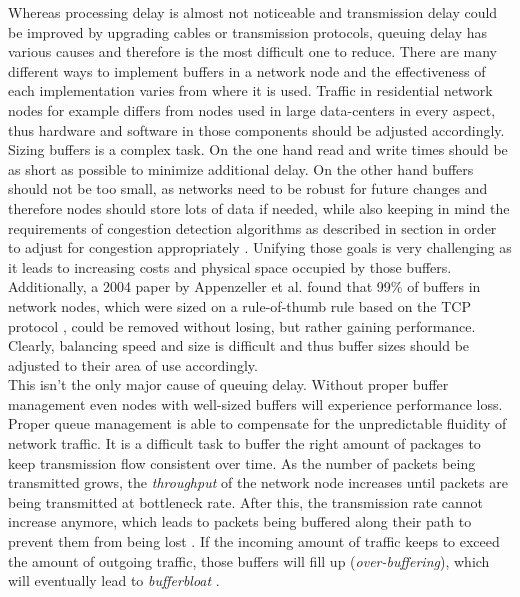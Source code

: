 \documentclass[a4paper,conference]{IEEEtran}
\begin{document}
Whereas processing delay is almost not noticeable and transmission delay could be improved by upgrading cables or transmission protocols, queuing delay has various causes and therefore is the  most difficult one to reduce. There are many different ways to implement buffers in a network node and the effectiveness of each implementation varies from where it is used. Traffic in residential network nodes for example differs from nodes used in large data-centers in every aspect, thus hardware and software in those components should be adjusted accordingly.
\\Sizing buffers is a complex task. On the one hand read and write times should be as short as possible to minimize additional delay. On the other hand buffers should not be too small, as networks need to be robust for future changes and therefore nodes should store lots of data if needed, while also keeping in mind the requirements of congestion detection algorithms as described in section  in order to adjust for congestion appropriately \cite{staff2012bufferbloat}. Unifying those goals is very challenging as it leads to increasing costs and physical space occupied by those buffers. Additionally, a 2004 paper by Appenzeller et al. \cite{appenzeller2004sizing} found that 99\% of buffers in network nodes, which were sized on a rule-of-thumb rule based on the TCP protocol \cite{villamizar1994high}, could be removed without losing, but rather gaining performance. Clearly, balancing speed and size is difficult and thus buffer sizes should be adjusted to their area of use accordingly.
\\This isn't the only major cause of queuing delay. Without proper buffer management even nodes with well-sized buffers will experience performance loss. Proper queue management is able to compensate for the unpredictable fluidity of network traffic. It is a difficult task to buffer the right amount of packages to keep transmission flow consistent over time.
As the number of packets being transmitted grows, the \textit{throughput} of the network node increases until packets are being transmitted at bottleneck rate. After this, the transmission rate cannot increase anymore, which leads to packets being buffered along their path to prevent them from being lost \cite{gettys2012bufferbloat}. If the incoming amount of traffic keeps to exceed the amount of outgoing traffic, those buffers will fill up (\textit{over-buffering}), which will eventually lead to \textit{bufferbloat} \cite{Allman13commentson,6886125}.
\end{document}
